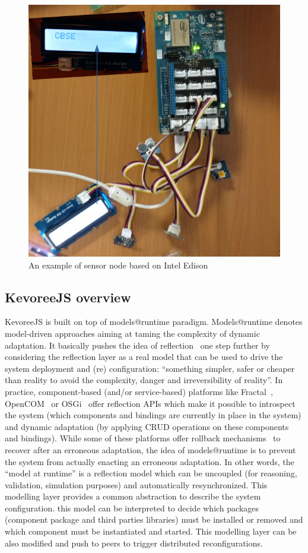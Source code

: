 \begin{figure}[h]
	\centering
	\includegraphics[width=0.8\linewidth]{figures/fig4}
	\caption{An example of sensor node based on Intel Edison}
	\label{fig:fig2}
\end{figure}


\subsection{KevoreeJS overview }
KevoreeJS is built on top of models@runtime paradigm. Models@runtime denotes model-driven approaches aiming at taming the complexity of dynamic adaptation. It basically pushes the idea of reflection~\cite{DBLP:conf/icse/MorinBNJ09} one step further by considering the reflection layer as a real model that can be used to drive the system deployment and (re) configuration: ``something simpler, safer or cheaper than reality to avoid the complexity, danger and irreversibility of reality''. In practice, component-based (and/or service-based) platforms like Fractal~\cite{bruneton2006fractal}, OpenCOM~\cite{grace2005reflective} or OSGi~\cite{hall2011osgi} offer reflection APIs which make it possible to introspect the system (which components and bindings are currently in place in the system) and dynamic adaptation (by applying CRUD operations on these components and bindings). While some of these platforms offer rollback mechanisms~\cite{david2006safe} to recover after an erroneous adaptation, the idea of models@runtime is to prevent the system from actually enacting an erroneous adaptation. In other words, the ``model at runtime'' is a reflection model which can be uncoupled (for reasoning, validation, simulation purposes) and automatically resynchronized. This modelling layer provides a common abstraction to describe the system configuration. this model can be interpreted to decide which packages (component package and third parties libraries) must be installed or removed and which component must be instantiated and started. This modelling layer can be also modified and push to peers to trigger distributed reconfigurations. 


